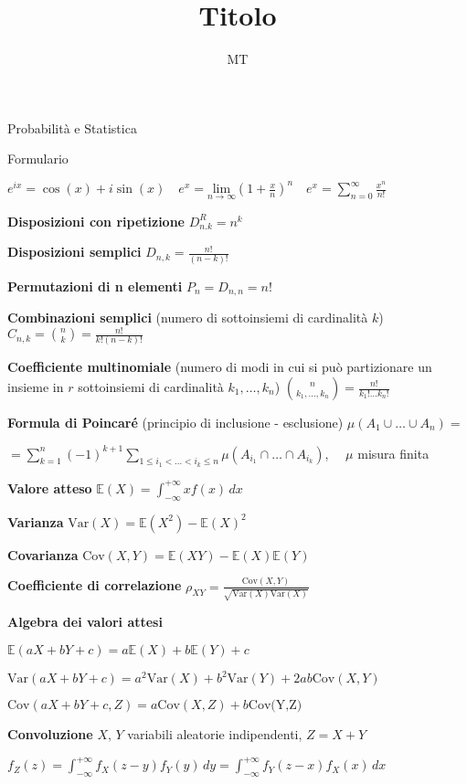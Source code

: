 \documentclass[openany]{book} %
\title{Titolo}
\date{}
\author{MT}
\begin{document}
\begin{center}
\Large Probabilità e Statistica 

\large Formulario
\end{center}

$e^{ix} = \cos(x)+i\sin(x) \quad e^x = \underset{n \rightarrow\infty}{\text{lim}}\left(1+\frac{x}{n}\right)^n \quad e^x=\sum_{n=0}^\infty \frac{x^n}{n!}$

\textbf{Disposizioni con ripetizione} $D^R_{n.k}=n^k$

\textbf{Disposizioni semplici} $D_{n,k}=\frac{n!}{(n-k)!}$

\textbf{Permutazioni di n elementi} \quad $P_n = D_{n,n}=n!$

\textbf{Combinazioni semplici} (numero di sottoinsiemi di cardinalità $k$) \quad $C_{n,k}=\binom {n}{k} = \frac{n!}{k!(n-k)!}$

\textbf{Coefficiente multinomiale} (numero di modi in cui si può partizionare un insieme in $r$ sottoinsiemi di cardinalità $k_1,\dots,k_n$) \quad $\binom {n}{k_1,\dots,k_n}=\frac{n!}{k_1 ! \dots k_n !}$ 

\textbf{Formula di Poincaré} (principio di inclusione - esclusione) \quad $\mu(A_1 \cup \dots \cup A_n) =$ 

$= \sum_{k=1}^n (-1)^{k+1}\sum_{1\leq i_1 < \dots <i_k \leq n}\mu(A_{i_1}\cap \dots \cap A_{i_k})$, $\quad \mu$ misura finita

\textbf{Valore atteso} $\mathbb{E}(X) = \int_{-\infty}^{+\infty}xf(x)\,dx$

\textbf{Varianza} $\text{Var}(X)=\mathbb{E}(X^2)-\mathbb{E}(X)^2$

\textbf{Covarianza} $\text{Cov}(X,Y)=\mathbb{E}(XY)-\mathbb{E}(X)\mathbb{E}(Y)$

\textbf{Coefficiente di correlazione} $\rho_{XY} = \frac{\text{Cov}(X,Y)}{\sqrt {\text{Var}(X)\text{Var}(X)}}$

\textbf{Algebra dei valori attesi}

$\mathbb {E}(aX+bY+c)= a\mathbb{E}(X)+b \mathbb{E}(Y)+c$

$\text {Var}(aX+bY+c)= a^2 \text{Var}(X)+b^2 \text{Var}(Y)+2ab\text{Cov}(X,Y)$

$\text{Cov}(aX+bY+c,Z) = a \text{Cov}(X,Z)+b \text{Cov(Y,Z)}$

\textbf{Convoluzione} $X,\,Y$ variabili aleatorie indipendenti, $Z=X+Y$

$f_Z(z) = \int_{-\infty}^{+\infty}f_X(z-y)f_Y(y)\,dy = \int_{-\infty}^{+\infty}f_Y(z-x)f_X(x)\,dx$
\end{document}
